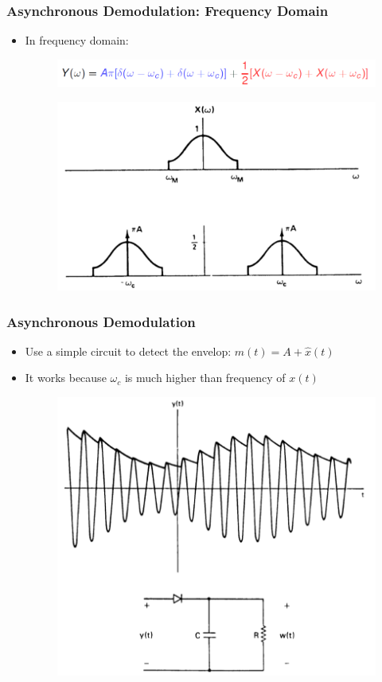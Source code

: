 \documentclass{beamer}
\begin{document}
\begin{frame}
\frametitle{Asynchronous Demodulation: Frequency Domain}
\begin{itemize}
\item In frequency domain: 
\begin{figure}
\includegraphics[width=0.8\linewidth]{asyn1}
\end{figure}
\begin{figure}
\includegraphics[width=0.8\linewidth]{asyn3}
\end{figure}
\end{itemize} 
\end{frame}

\begin{frame}
\frametitle{Asynchronous Demodulation}
\begin{itemize}
\item Use a simple circuit to detect the envelop: $m(t) = A + \hat{x}(t)$
\item It works because  $\omega_c$ is much higher than frequency of $x(t)$
\begin{figure}
\includegraphics[width=0.6\linewidth]{asyn4}
\end{figure}
\end{itemize}
\end{frame}
\end{document}
